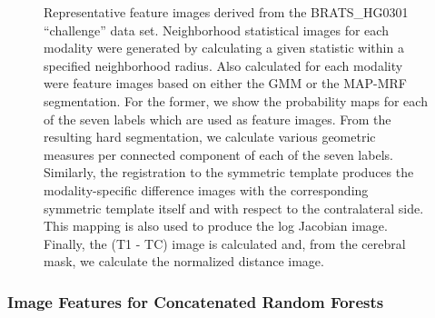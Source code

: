 \documentclass[preprint,authoryear,review,12pt]{elsarticle}
\begin{document}
\begin{figure}
\centering
  \caption{Representative feature images derived from the 
           BRATS\_HG0301  ``challenge'' data set.
           Neighborhood statistical images for each modality were 
           generated by calculating a given statistic within
           a specified neighborhood radius.  Also calculated for each modality were feature
           images based on either the GMM or the MAP-MRF segmentation.  For the former, we
           show the probability maps for each of the seven labels which are used as feature
           images.  From the resulting hard segmentation, we calculate various geometric 
           measures per connected component of each of the seven labels.  Similarly, the 
           registration to the symmetric template produces the modality-specific 
           difference images with the
           corresponding symmetric template itself and with respect to the 
           contralateral side.   
           This mapping is also used to produce the log Jacobian image.  Finally, the 
           (T1 - TC) image is calculated and, from the
           cerebral mask, we calculate the normalized distance image.  
           }
  \label{fig:featureImages}         
\end{figure}


\subsubsection{Image Features for Concatenated Random Forests}
\end{document}
